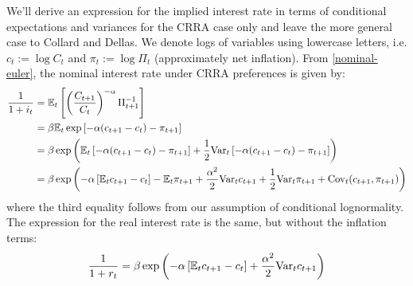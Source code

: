 We'll derive an expression for the implied interest rate in terms of conditional expectations and variances for the CRRA case only and leave the more general case to Collard and Dellas. We denote logs of variables using lowercase letters, i.e. $c_t := \log C_t$ and $\pi_t := \log \Pi_t$ (approximately net inflation). From \eqref{nominal-euler}, the nominal interest rate under CRRA preferences is given by:
\begin{align}
\label{nominal-euler-crra}
\frac{1}{1 + i_t} &= \mathbb{E}_t \left[  \left( \frac{C_{t+1}}{C_t} \right)^{-\alpha} \Pi_{t+1}^{-1}  \right] \\
  &= \beta \mathbb{E}_t \exp \left[  -\alpha(c_{t+1} - c_t) - \pi_{t+1}  \right] \nonumber \\
  &= \beta \exp \left(  \mathbb{E}_t \left[  -\alpha(c_{t+1} - c_t) - \pi_{t+1}  \right] + \frac{1}{2} \mathrm{Var}_t \left[  -\alpha(c_{t+1} - c_t) - \pi_{t+1}  \right]  \right) \nonumber \\
  &= \beta \exp \left(  -\alpha \left[  \mathbb{E}_t c_{t+1} - c_t  \right] - \mathbb{E}_t \pi_{t+1} + \frac{\alpha^2}{2} \mathrm{Var}_t c_{t+1} + \frac{1}{2} \mathrm{Var}_t \pi_{t+1} + \mathrm{Cov}_t(c_{t+1}, \pi_{t+1})  \right) \nonumber
\end{align}
where the third equality follows from our assumption of conditional lognormality. The expression for the real interest rate is the same, but without the inflation terms: $$\frac{1}{1 + r_t} = \beta \exp \left(  -\alpha \left[  \mathbb{E}_t c_{t+1} - c_t  \right] + \frac{\alpha^2}{2} \mathrm{Var}_t c_{t+1}  \right)$$

